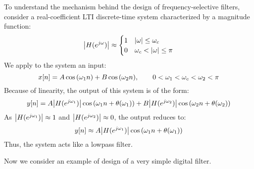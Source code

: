 \documentclass[../../main/main.tex]{subfiles}
\begin{document}
To understand the mechanism behind the design of frequency-selective filters, consider a real-coefficient LTI discrete-time system characterized by a magnitude function:
\begin{equation}
    \abs{H(e^{j \omega})}
    \approx
    \begin{cases}
        1   &   \abs{\omega} \le \omega_{c} \\
        0   &   \omega_{c} < \abs{\omega} \le \pi
    \end{cases}
    \label{eq:L09_S58_1}
\end{equation}
We apply to the system an input:
\begin{equation}
    x[n]
    =
    A \cos\qty(\omega_{1}n) + B \cos\qty(\omega_{2}n),
    \qquad
    0 < \omega_{1} < \omega_{c} < \omega_{2} < \pi
    \label{eq:L09_S59_1}
\end{equation}
Because of linearity, the output of this system is of the form:
\begin{equation}
    y[n]
    =
    A \abs{H(e^{j \omega_{1}})} \cos\qty(\omega_{1}n + \theta(\omega_{1})) +
    B \abs{H(e^{j \omega_{2}})} \cos\qty(\omega_{2}n + \theta(\omega_{2}))
    \label{eq:L09_S59_2}
\end{equation}
As \( \abs{H(e^{j \omega_{1}})} \approx 1 \) and \( \abs{H(e^{j \omega_{2}})} \approx 0 \), the output reduces to:
\begin{equation}
    y[n]
    \approx
    A \abs{H(e^{j \omega_{1}})} \cos\qty(\omega_{1}n + \theta(\omega_{1}))
    \label{eq:L09_S60_2}
\end{equation}
Thus, the system acts like a lowpass filter.

Now we consider an example of design of a very simple digital filter.
\end{document}
